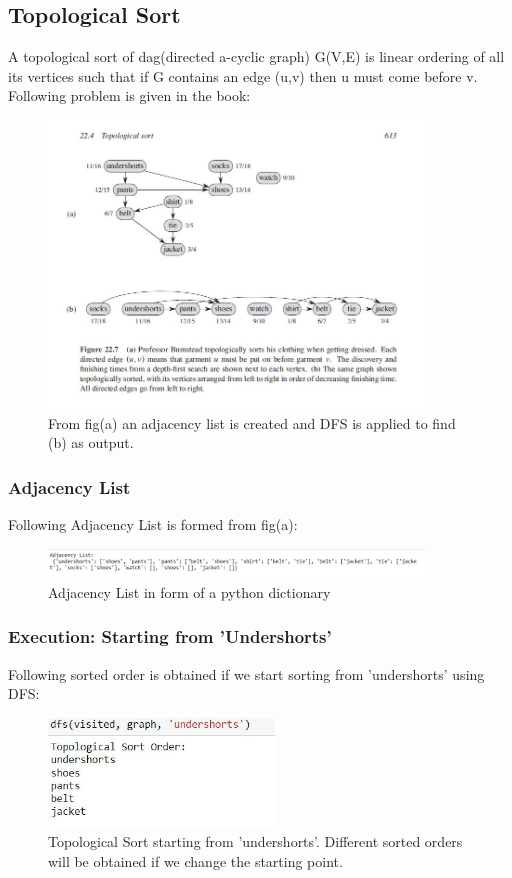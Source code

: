\documentclass[12pt,runningheads]{article}
\begin{document}
\subsection{Topological Sort}
A topological sort of dag(directed a-cyclic graph) G(V,E) is linear ordering of all its vertices such that if G contains an edge (u,v) then u must come before v.
Following problem is given in the book:
\begin{figure}[htp]
    \centering
    \includegraphics[width=10cm]{topologicalsortproblem.JPG}
    \caption{From fig(a) an adjacency list is created and DFS is applied to find (b) as output.}
    \label{fig:galaxy}
\end{figure}
\subsubsection{Adjacency List }
Following Adjacency List is formed from fig(a):
\begin{figure}[htp]
    \centering
    \includegraphics[width=10cm]{topadjlist1.JPG}
    \caption{Adjacency List in form of a python dictionary}
    \label{fig:galaxy}
\end{figure}
\subsubsection{Execution: Starting from 'Undershorts'}
Following sorted order is obtained if we start sorting from 'undershorts' using DFS:
\begin{figure}[htp]
    \centering
    \includegraphics[width=6cm]{topsort.JPG}
    \caption{Topological Sort starting from 'undershorts'. Different sorted orders will be obtained if we change the starting point.}
    \label{fig:galaxy}
\end{figure}
\end{document}

